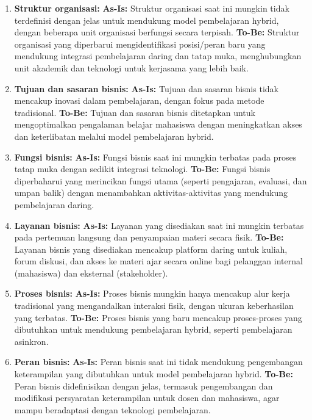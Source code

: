 \begin{enumerate}
	\item \textbf{Struktur organisasi:}  
	\textbf{As-Is:} Struktur organisasi saat ini mungkin tidak terdefinisi dengan jelas untuk mendukung model pembelajaran hybrid, dengan beberapa unit organisasi berfungsi secara terpisah.  
	\textbf{To-Be:} Struktur organisasi yang diperbarui mengidentifikasi posisi/peran baru yang mendukung integrasi pembelajaran daring dan tatap muka, menghubungkan unit akademik dan teknologi untuk kerjasama yang lebih baik.
	
	\item \textbf{Tujuan dan sasaran bisnis:}  
	\textbf{As-Is:} Tujuan dan sasaran bisnis tidak mencakup inovasi dalam pembelajaran, dengan fokus pada metode tradisional.  
	\textbf{To-Be:} Tujuan dan sasaran bisnis ditetapkan untuk mengoptimalkan pengalaman belajar mahasiswa dengan meningkatkan akses dan keterlibatan melalui model pembelajaran hybrid.
	
	\item \textbf{Fungsi bisnis:}  
	\textbf{As-Is:} Fungsi bisnis saat ini mungkin terbatas pada proses tatap muka dengan sedikit integrasi teknologi.  
	\textbf{To-Be:} Fungsi bisnis diperbaharui yang merincikan fungsi utama (seperti pengajaran, evaluasi, dan umpan balik) dengan menambahkan aktivitas-aktivitas yang mendukung pembelajaran daring.
	
	\item \textbf{Layanan bisnis:}  
	\textbf{As-Is:} Layanan yang disediakan saat ini mungkin terbatas pada pertemuan langsung dan penyampaian materi secara fisik.  
	\textbf{To-Be:} Layanan bisnis yang disediakan mencakup platform daring untuk kuliah, forum diskusi, dan akses ke materi ajar secara online bagi pelanggan internal (mahasiswa) dan eksternal (stakeholder).
	
	\item \textbf{Proses bisnis:}  
	\textbf{As-Is:} Proses bisnis mungkin hanya mencakup alur kerja tradisional yang mengandalkan interaksi fisik, dengan ukuran keberhasilan yang terbatas.  
	\textbf{To-Be:} Proses bisnis yang baru mencakup proses-proses yang dibutuhkan untuk mendukung pembelajaran hybrid, seperti pembelajaran asinkron. 
	
	\item \textbf{Peran bisnis:}  
	\textbf{As-Is:} Peran bisnis saat ini tidak mendukung pengembangan keterampilan yang dibutuhkan untuk model pembelajaran hybrid.  
	\textbf{To-Be:} Peran bisnis didefinisikan dengan jelas, termasuk pengembangan dan modifikasi persyaratan keterampilan untuk dosen dan mahasiswa, agar mampu beradaptasi dengan teknologi pembelajaran.
	

\end{enumerate}
